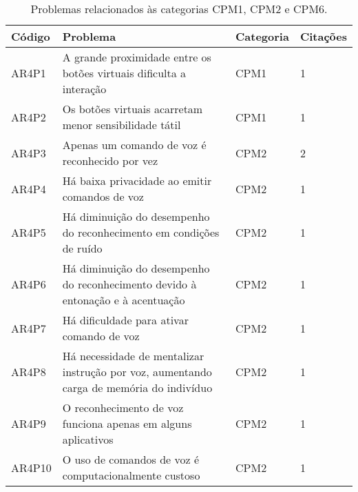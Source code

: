\begin{table}[htb]
  \begin{center}
    \ABNTEXfontereduzida
    \caption{Problemas relacionados às categorias CPM1, CPM2 e CPM6.}
    \label{tab-pro-1-2-6}
    \begin{tabular}{p{1.2cm}|p{10.0cm}|p{1.4cm}|p{1.4cm}}
      \textbf{Código} & \textbf{Problema}                                                                               & \textbf{Categoria} & \textbf{Citações} \\
      \hline
      AR4P1           & A grande proximidade entre os botões virtuais dificulta a interação                             & CPM1               & 1                 \\
      \hline
      AR4P2           & Os botões virtuais acarretam menor sensibilidade tátil                                          & CPM1               & 1                 \\
      \hline
      AR4P3           & Apenas um comando de voz é reconhecido por vez                                                  & CPM2               & 2                 \\
      \hline
      AR4P4           & Há baixa privacidade ao emitir comandos de voz                                                  & CPM2               & 1                 \\
      \hline
      AR4P5           & Há diminuição do desempenho do reconhecimento em condições de ruído                             & CPM2               & 1                 \\
      \hline
      AR4P6           & Há diminuição do desempenho do reconhecimento devido à entonação e à acentuação                 & CPM2               & 1                 \\
      \hline
      AR4P7           & Há dificuldade para ativar comando de voz                                                       & CPM2               & 1                 \\
      \hline
      AR4P8           & Há necessidade de mentalizar instrução por voz, aumentando carga de memória do indivíduo        & CPM2               & 1                 \\
      \hline
      AR4P9           & O reconhecimento de voz funciona apenas em alguns aplicativos                                   & CPM2               & 1                 \\
      \hline
      AR4P10          & O uso de comandos de voz é computacionalmente custoso                                           & CPM2               & 1                 \\

\end{tabular}
\end{center}
\end{table}
